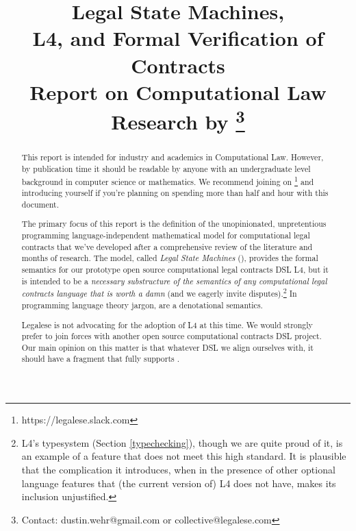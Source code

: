 \documentclass[12pt]{article}
\title{Legal State Machines, \\
L4, and Formal Verification of Contracts \\
\smaller \smaller Report on Computational Law Research by \extlink{https://legalese.com}{Legalese}\footnote{Contact: dustin.wehr@gmail.com or collective@legalese.com}\larger \larger }
\newcommand{\termz}[2]{\EM{\textsf{\hyperref[#1]{#2}}}\xspace}
\newcommand{\lsms}{\termz{LSM}{LSMs}}
\begin{document}
\maketitle

\begin{abstract}
This report is intended for industry and academics in Computational Law. However, by publication time it should be readable by anyone with an undergraduate level background in computer science or mathematics. We recommend joining  on \footnote{https://legalese.slack.com} and introducing yourself if you're planning on spending more than half and hour with this document. %

The primary focus of this report is the definition of the unopinionated, unpretentious programming language-independent mathematical model for computational legal contracts that we've developed after a comprehensive review of the literature and months of research. The model, called \textit{Legal State Machines} (\lsms), provides the formal semantics for our prototype open source computational legal contracts DSL L4, but it is intended to be a \textit{necessary substructure of the semantics of any computational legal contracts language that is worth a damn} (and we eagerly invite disputes).\footnote{L4's typesystem (Section \ref{typechecking}), though we are quite proud of it, is an example of a feature that does not meet this high standard. It is plausible that the complication it introduces, when in the presence of other optional language features that (the current version of) L4 does not have, makes its inclusion unjustified.}
In programming language theory jargon, \lsms are a denotational semantics.

Legalese is not advocating for the adoption of L4 at this time. We would strongly prefer to join forces with another open source computational contracts DSL project. Our main opinion on this matter is that whatever DSL we align ourselves with, it should have a fragment that fully supports \lsms.
\end{abstract}
\end{document}
